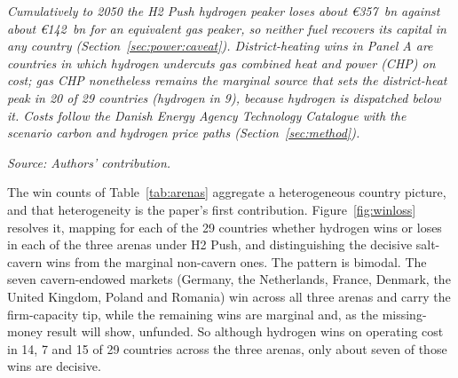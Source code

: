 \begin{table}[htbp]
    \vspace{8pt}
    \begin{minipage}{\textwidth}
    \raggedright\footnotesize
    \textit{Cumulatively to 2050 the H2 Push hydrogen peaker loses about
    \euro{}357~bn against about \euro{}142~bn for an equivalent gas peaker, so neither fuel
    recovers its capital in any country (Section~\ref{sec:power:caveat}). District-heating wins
    in Panel A are countries in which hydrogen undercuts gas combined heat and power (CHP) on
    cost; gas CHP nonetheless remains the marginal source that sets the district-heat peak in 20
    of 29 countries (hydrogen in 9), because hydrogen is dispatched below it. Costs follow the
    Danish Energy Agency Technology Catalogue \citep{DEA2023technology} with the scenario carbon
    and hydrogen price paths (Section~\ref{sec:method}).}\par
    \smallskip
    \textit{Source: Authors' contribution.}\par
    \end{minipage}
\end{table}

The win counts of Table~\ref{tab:arenas} aggregate a heterogeneous country picture, and that
heterogeneity is the paper's first contribution. Figure~\ref{fig:winloss} resolves it,
mapping for each of the 29 countries whether hydrogen wins or loses in each of the three
arenas under H2 Push, and distinguishing the decisive salt-cavern wins from the marginal
non-cavern ones. The pattern is bimodal. The seven cavern-endowed markets (Germany, the
Netherlands, France, Denmark, the United Kingdom, Poland and Romania) win across all three
arenas and carry the firm-capacity tip, while the remaining wins are marginal and, as the
missing-money result will show, unfunded. So although hydrogen wins on operating cost in 14,
7 and 15 of 29 countries across the three arenas, only about seven of those wins are
decisive.

